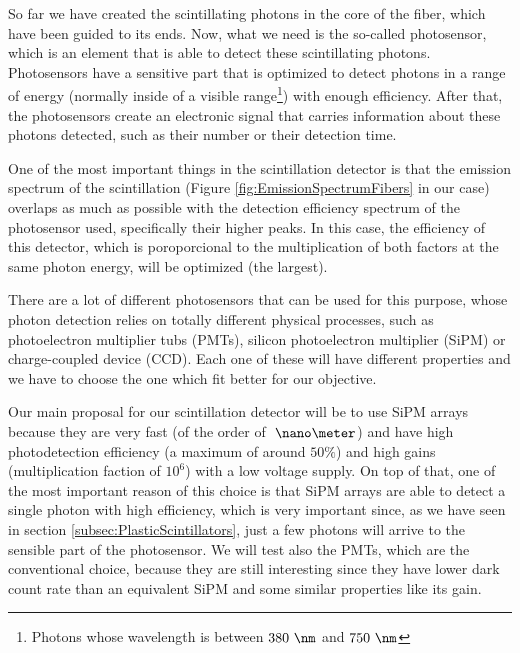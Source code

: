 So far we have created the scintillating photons in the core of the fiber, which have been guided to its ends. Now, what we need is the so-called photosensor, which is an element that is able to detect these scintillating photons. Photosensors have a sensitive part that is optimized to detect photons in a range of energy (normally inside of a visible range\footnote{Photons whose wavelength is between $380~\nm$ and $750~\nm$}) with enough efficiency. After that, the photosensors create an electronic signal that carries information about these photons detected, such as their number or their detection time.

One of the most important things in the scintillation detector is that the emission spectrum of the scintillation (Figure \ref{fig:EmissionSpectrumFibers} in our case) overlaps as much as possible with the detection efficiency spectrum of the photosensor used, specifically their higher peaks. In this case, the efficiency of this detector,  which is poroporcional to the multiplication of both factors at the same photon energy, will be optimized (the largest).

There are a lot of different photosensors that can be used for this purpose, whose photon detection relies on totally different physical processes, such as photoelectron multiplier tubs (PMTs), silicon photoelectron multiplier (SiPM) or charge-coupled device (CCD).  Each one of these will have different properties and we have to choose the one which fit better for our objective.

Our main proposal for our scintillation detector will be to use SiPM arrays because they are very fast (of the order of $~\nano\meter$) and have high photodetection efficiency (a maximum of around $50\%$) and high gains (multiplication faction of $10^{6}$) with a low voltage supply. On top of that, one of the most important reason of this choice is that SiPM arrays are able to detect a single photon with high efficiency, which is very important since, as we have seen in section \ref{subsec:PlasticScintillators}, just a few photons will arrive to the sensible part of the photosensor. We will test also the PMTs, which are the conventional choice, because they are still interesting since they have lower dark count rate than an equivalent SiPM and some similar properties like its gain.




